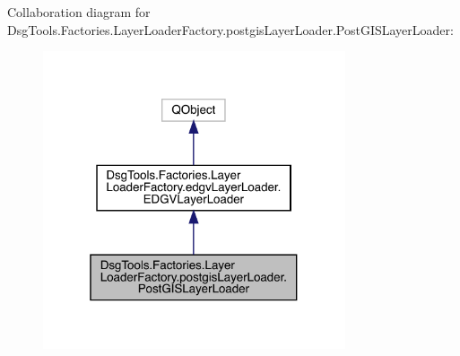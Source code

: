 Collaboration diagram for Dsg\+Tools.\+Factories.\+Layer\+Loader\+Factory.\+postgis\+Layer\+Loader.\+Post\+G\+I\+S\+Layer\+Loader\+:
\nopagebreak
\begin{figure}[H]
\begin{center}
\leavevmode
\includegraphics[width=253pt]{class_dsg_tools_1_1_factories_1_1_layer_loader_factory_1_1postgis_layer_loader_1_1_post_g_i_s_layer_loader__coll__graph}
\end{center}
\end{figure}
